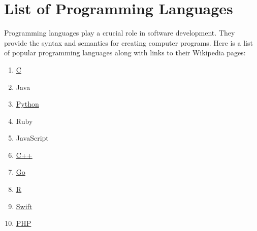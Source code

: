 \documentclass{article}
\begin{document}
\section*{List of Programming Languages}

Programming languages play a crucial role in software development. They provide the syntax and semantics for creating computer programs. Here is a list of popular programming languages along with links to their Wikipedia pages:

\begin{enumerate}
  \item \href{https://en.wikipedia.org/wiki/C_(programming_language)}{C}
  \item Java
  \item \href{https://en.wikipedia.org/wiki/Python_(programming_language)}{Python}
  \item Ruby
  \item JavaScript
  \item \href{https://en.wikipedia.org/wiki/C++}{C++}
  \item \href{https://en.wikipedia.org/wiki/Go_(programming_language)}{Go}
  \item \href{https://en.wikipedia.org/wiki/R_(programming_language)}{R}
  \item \href{https://en.wikipedia.org/wiki/Swift_(programming_language)}{Swift}
  \item \href{https://en.wikipedia.org/wiki/PHP}{PHP}
\end{enumerate}
\end{document}
